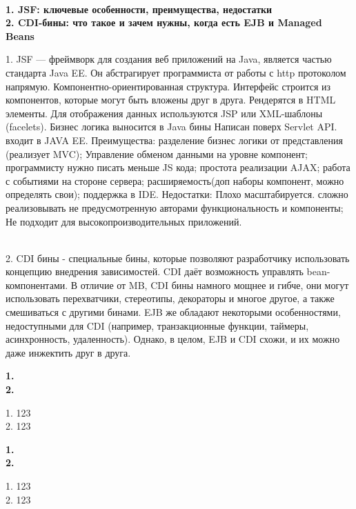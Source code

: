 \documentclass{article}
\newcommand{\bil}[4]{%
    \begin{minipage}{.3\textwidth}
        \textbf{1. #1} \\
        \textbf{2. #2}

        1. #3
        \\
        2. #4
    \end{minipage}
}
\begin{document}
\\
\bil{JSF: ключевые особенности, преимущества, недостатки}{CDI-бины: что такое и зачем нужны, когда есть EJB и Managed Beans}{
    JSF — фреймворк для создания веб приложений на Java, является частью стандарта Java EE. Он абстрагирует программиста от работы с http протоколом напрямую.
    Компонентно-ориентированная структура. Интерфейс строится из компонентов, которые могут быть вложены друг в друга. Рендерятся в HTML элементы.
    Для отображения данных используются JSP или XML-шаблоны (facelets).
    Бизнес логика выносится в Java бины
    Написан поверх Servlet API. входит в JAVA EE.
    Преимущества: разделение бизнес логики от представления (реализует MVC);
    Управление обменом данными на уровне компонент;
    программисту нужно писать меньше JS кода;
    простота реализации AJAX;
    работа с событиями на стороне сервера;
    расширяемость(доп наборы компонент, можно определять свои);
    поддержка в IDE.
    Недостатки:
    Плохо масштабируется. сложно реализовывать не предусмотренную авторами функциональность и компоненты;
    Не подходит для высокопроизводительных приложений.
}{
    CDI бины - специальные бины, которые позволяют разработчику использовать концепцию внедрения зависимостей. 
    CDI даёт возможность управлять bean-компонентами. 
    В отличие от MB, CDI бины намного мощнее и гибче, они могут использовать перехватчики, стереотипы, декораторы и многое другое, а также смешиваться с другими бинами. 
    EJB же обладают некоторыми особенностями, недоступными для CDI (например, транзакционные функции, таймеры, асинхронность, удаленность). 
    Однако, в целом, EJB и CDI схожи, и их можно даже инжектить друг в друга. 
}
\hfill
\bil{}{}{123}{123}
\hfill
\bil{}{}{123}{123}
\end{document}

